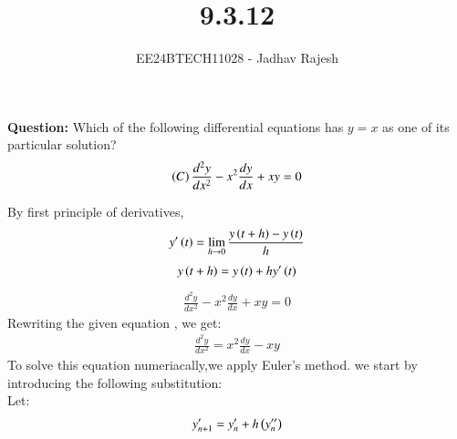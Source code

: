\documentclass[journal]{IEEEtran}
\begin{document}

\vspace{3cm}
\title{9.3.12}
\author{EE24BTECH11028 - Jadhav Rajesh}
{\let\newpage\relax\maketitle}

\renewcommand{\thefigure}{\theenumi}
\renewcommand{\thetable}{\theenumi}
\setlength{\intextsep}{10pt} %


\renewcommand{\thetable}{\theenumi}
 \textbf{Question:} Which of the following differential equations has $y = x$ as one of its particular solution?\\
 \begin{align}
 \left(C\right)  \frac{d^{2}y}{dx^{2}}-x^{2}\frac{dy}{dx}+xy=0
 \end{align}
                         
 \solution 
  By first principle of derivatives,
  \begin{align}
      y'\left(t\right)= \lim_{h \to 0} \frac{y\left(t+h\right)-y\left(t\right)}{h}
  \end{align}
  \begin{align}
      y\left(t+h\right) = y\left(t\right)+hy'\left(t\right)
  \end{align}
  \begin{align}
  \frac{d^{2}y}{dx^{2}}-x^{2}\frac{dy}{dx}+xy=0
  \end{align}
  Rewriting the given equation , we get:
  \begin{align}
      \frac{d^{2}y}{dx^{2}}=x^{2}\frac{dy}{dx}-xy
  \end{align}
  To solve this equation numeriacally,we apply Euler's method. we start by introducing the following substitution:\\
  Let:
  \begin{align}
  y'_{n+1}=y'_{n}+h\left(y''_{n}\right)
  \end{align}
      
\end{document}
